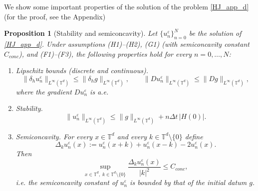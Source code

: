 \documentclass[11pt]{amsart}
\newtheorem{prop}[thm]{Proposition}
\theoremstyle{remark}
\theoremstyle{definition}
\theoremstyle{Claim}
\newcommand{\T}{{\mathbb{T}}}
\theoremstyle{plain}
\begin{document}
We show some important properties of the solution of the problem \eqref{HJ_app_d}
(for the proof, see the Appendix)
\begin{prop}[Stability and semiconcavity]\label{prop:properties_scheme}
Let \(\{u^\varepsilon_n\}_{n=0}^N\) be the solution of \eqref{HJ_app_d}. 
Under assumptions \textup{(H1)--(H2)}, \textup{(G1)} (with semiconcavity constant \(C_{conc}\)), and \textup{(F1)--(F3)}, the following properties hold for every \(n=0,\dots,N\):
\begin{enumerate}
  \item[\textup{(i)}] Lipschitz bounds (discrete and continuous).
  \[
    \|\delta_h u^\varepsilon_n\|_{L^\infty(\T^d)} \le \|\delta_h g\|_{L^\infty(\T^d)},
    \qquad
    \|Du^\varepsilon_n\|_{L^\infty(\T^d)} \le \|Dg\|_{L^\infty(\T^d)},
  \]
  where the gradient \(Du^\varepsilon_n\) is a.e.
  \item[\textup{(ii)}] Stability.
  \[
    \|u^\varepsilon_n\|_{L^\infty(\T^d)} \le \|g\|_{L^\infty(\T^d)} + n\Delta t\,|H(0)|.
  \]
  \item[\textup{(iii)}] Semiconcavity. For every \(x\in\T^d\) and every \(k\in\T^d\setminus\{0\}\) define
  \[
    \Delta_k u^\varepsilon_n(x):=u^\varepsilon_n(x+k)+u^\varepsilon_n(x-k)-2u^\varepsilon_n(x).
  \]
  Then
  \begin{equation}\label{semiconc_solutions_finite_diff}
    \sup_{x\in\T^d,\; k\in \T^d\setminus\{0\}}\frac{\Delta_k u^\varepsilon_n(x)}{|k|^2} \le C_{conc},
  \end{equation}
  i.e. the semiconcavity constant of \(u^\varepsilon_n\) is bounded by that of the initial datum \(g\).
\end{enumerate}
\end{prop}
\end{document}
